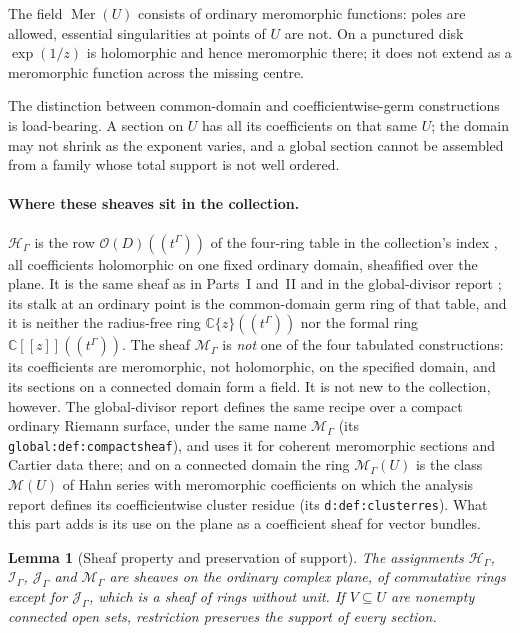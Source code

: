 \documentclass[11pt,letterpaper]{article}
\newtheorem{lemma}[lemma]{Lemma}
\theoremstyle{definition}
\theoremstyle{remark}
\newcommand{\C}{\mathbb C}
\newcommand{\OO}{\mathcal O}
\newcommand{\HH}{\mathscr H_\Gamma}
\newcommand{\II}{\mathscr I_\Gamma}
\newcommand{\JJ}{\mathscr J_\Gamma}
\newcommand{\MM}{\mathscr M_\Gamma}
\newcommand{\Mer}{\operatorname{Mer}}
\numberwithin{equation}{section}
\begin{document}
The field $\Mer(U)$ consists of ordinary meromorphic functions: poles are
allowed, essential singularities at points of $U$ are not. On a punctured disk
$\exp(1/z)$ is holomorphic and hence meromorphic there; it does not extend as a
meromorphic function across the missing centre.

The distinction between common-domain and coefficientwise-germ constructions
is load-bearing. A section on $U$ has all its coefficients on that same $U$;
the domain may not shrink as the exponent varies, and a global section cannot
be assembled from a family whose total support is not well ordered.

\paragraph{Where these sheaves sit in the collection.}
$\HH$ is the row $\OO(D)((t^\Gamma))$ of the four-ring table in the
collection's index \cite{RepoMap}, all coefficients holomorphic on one fixed
ordinary domain, sheafified over the plane. It is the same sheaf
as in Parts~I and~II and in the global-divisor report \cite{RepoGlobal}; its
stalk at an ordinary point is the common-domain germ ring of that table, and it
is neither the radius-free ring $\C\{z\}((t^\Gamma))$ nor the formal ring
$\C[[z]]((t^\Gamma))$. The sheaf $\MM$ is \emph{not} one of the four tabulated
constructions: its coefficients are meromorphic, not holomorphic, on the
specified domain, and its sections on a connected domain form a field. It is
not new to the collection, however. The global-divisor report defines the same
recipe over a compact ordinary Riemann surface, under the same name
$\mathscr M_\Gamma$ (its \texttt{global:def:compactsheaf}), and uses it for
coherent meromorphic sections and Cartier data there; and on a connected
domain the ring $\MM(U)$ is the class $\mathcal M(U)$ of Hahn series with
meromorphic coefficients on which the analysis report \cite{RepoAnalysis}
defines its coefficientwise cluster residue (its \texttt{d:def:clusterres}).
What this part adds is its use on the plane as a coefficient sheaf for vector
bundles.

\begin{lemma}[Sheaf property and preservation of support]\label{nab:loc:lem:sheaf}
The assignments $\HH$, $\II$, $\JJ$ and $\MM$ are sheaves on the ordinary
complex plane, of commutative rings except for $\JJ$, which is a sheaf of
rings without unit. If $V\subseteq U$ are nonempty connected open sets,
restriction preserves the support of every section.
\end{lemma}
\end{document}
